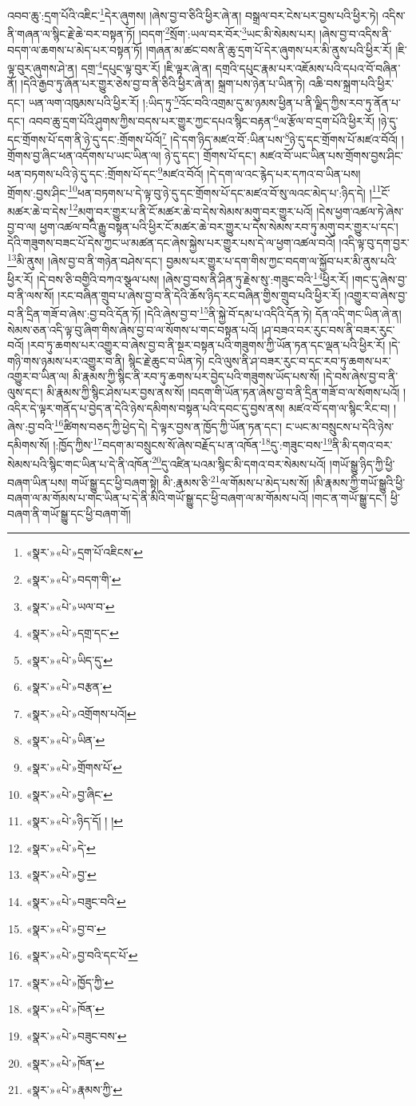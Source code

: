 འབབ་ཆུ་:དྲག་པོའི་འཇིང་\footnote{«སྣར་»«པེ་»དྲག་པོ་འཇིངས་}དེར་ཞུགས། །ཞེས་བྱ་བ་ཅིའི་ཕྱིར་ཞེ་ན། བསྒྲལ་བར་ངེས་པར་བྱས་པའི་ཕྱིར་ཏེ། འདིས་ནི་གཞན་ལ་སྙིང་རྗེ་ཆེ་བར་བསྟན་ཏོ། །བདག་\footnote{«སྣར་»«པེ་»བདག་གི་}སྲོག་:ཡལ་བར་བོར་\footnote{«སྣར་»«པེ་»ཡལ་བ་}ཡང་མི་སེམས་པར། །ཞེས་བྱ་བ་འདིས་ནི་བདག་ལ་ཆགས་པ་མེད་པར་བསྟན་ཏོ། །གཞན་མ་ཚང་བས་ནི་ཆུ་དྲག་པོ་དེར་ཞུགས་པར་མི་ནུས་པའི་ཕྱིར་རོ། །ཇི་ལྟ་བུར་ཞུགས་ཤེ་ན། དགྲ་\footnote{«སྣར་»«པེ་»དགྲ་དང་}དཔུང་ལྟ་བུར་རོ། །ཇི་ལྟར་ཞེ་ན། དགྲའི་དཔུང་རྣམ་པར་འཇོམས་པའི་དཔའ་བོ་བཞིན་ནོ། །དེའི་རྒྱབ་ཏུ་ཞོན་པར་གྱུར་ཅེས་བྱ་བ་ནི་ཅིའི་ཕྱིར་ཞེ་ན། སྐྲག་པས་ཉེན་པ་ཡིན་ཏེ། འཆི་བས་སྐྲག་པའི་ཕྱིར་དང་། ཡན་ལག་འཁུམས་པའི་ཕྱིར་རོ། །:ཡིད་ཏུ་\footnote{«སྣར་»«པེ་»ཡིད་དུ་}འོང་བའི་འགྲམ་དུ་མ་ཉམས་ཕྱིན་པ་ནི་ལྗིད་ཀྱིས་རབ་ཏུ་ནོན་པ་དང་། འབབ་ཆུ་དྲག་པོའི་ཤུགས་ཀྱིས་བདས་པར་གྱུར་ཀྱང་དཔའ་སྙིང་བརྟན་\footnote{«སྣར་»«པེ་»བརྩན་}ལ་རྩོལ་བ་དྲག་པོའི་ཕྱིར་རོ། །ཉེ་དུ་དང་གྲོགས་པོ་དག་ནི་ཉེ་དུ་དང་:གྲོགས་པོའོ།\footnote{«སྣར་»«པེ་»འགྲོགས་པའོ།} །དེ་དག་ཉིད་མཛའ་བོ་:ཡིན་པས་\footnote{«སྣར་»«པེ་»ཡིན་}ཉེ་དུ་དང་གྲོགས་པོ་མཛའ་བོའོ། །གྲོགས་བྱ་ཞིང་ཕན་འདོགས་པ་ཡང་ཡིན་ལ། ཉེ་དུ་དང་། གྲོགས་པོ་དང་། མཛའ་བོ་ཡང་ཡིན་པས་གྲོགས་བྱས་ཤིང་ཕན་བཏགས་པའི་ཉེ་དུ་དང་:གྲོགས་པོ་དང་\footnote{«སྣར་»«པེ་»གྲོགས་པོ་}མཛའ་བོའོ། །དེ་དག་ལ་འང་རྙེད་པར་དཀའ་བ་ཡིན་པས། གྲོགས་:བྱས་ཤིང་\footnote{«སྣར་»«པེ་»བྱ་ཞིང་}ཕན་བཏགས་པ་དེ་ལྟ་བུ་ཉེ་དུ་དང་གྲོགས་པོ་དང་མཛའ་བོ་སུ་ལའང་མེད་པ་:ཉིད་དེ། །\footnote{«སྣར་»«པེ་»ཉིད་དོ། ། །}ངོ་མཚར་ཆེ་བ་དེས་\footnote{«སྣར་»«པེ་»དེ་}མགུ་བར་གྱུར་པ་ནི་ངོ་མཚར་ཆེ་བ་དེས་སེམས་མགུ་བར་གྱུར་པའོ། །དེས་ཕྱག་འཚལ་ཏེ་ཞེས་བྱ་བ་ལ། ཕྱག་འཚལ་བའི་རྒྱུ་བསྟན་པའི་ཕྱིར་ངོ་མཚར་ཆེ་བར་གྱུར་པ་དེས་སེམས་རབ་ཏུ་མགུ་བར་གྱུར་པ་དང་། དེའི་གཟུགས་བཟང་པོ་དེས་ཀྱང་ཡ་མཚན་དང་ཞེས་སྐྱེས་པར་གྱུར་པས་དེ་ལ་ཕྱག་འཚལ་བའོ། །འདི་ལྟ་བུ་དག་བྱར་\footnote{«སྣར་»«པེ་»བྱ་}མི་ནུས། །ཞེས་བྱ་བ་ནི་གཉེན་བཤེས་དང་། བྱམས་པར་གྱུར་པ་དག་གིས་ཀྱང་བདག་ལ་སྐྱོབ་པར་མི་ནུས་པའི་ཕྱིར་རོ། །དེ་བས་ཅི་བགྱིའི་བཀའ་སྩལ་པས། །ཞེས་བྱ་བས་ནི་ཤིན་ཏུ་རྗེས་སུ་:གཟུང་བའི་\footnote{«སྣར་»«པེ་»བཟུང་བའི་}ཕྱིར་རོ། །གང་དུ་ཞེས་བྱ་བ་ནི་ལས་སོ། །རང་བཞིན་གྲུབ་པ་ཞེས་བྱ་བ་ནི་དེའི་ཆོས་ཉིད་རང་བཞིན་གྱིས་གྲུབ་པའི་ཕྱིར་རོ། །འགྱུར་བ་ཞེས་བྱ་བ་ནི་དྲིན་གཟོ་བ་ཞེས་:བྱ་བའི་དོན་ཏོ། །དེའི་ཞེས་བྱ་བ་\footnote{«སྣར་»«པེ་»བྱ་བ་}ནི་སྐྱེ་བོ་དམ་པ་འདིའི་དོན་ཏེ། དོན་འདི་གང་ཡིན་ཞེ་ན། སེམས་ཅན་འདི་ལྟ་བུ་ཞིག་གིས་ཞེས་བྱ་བ་ལ་སོགས་པ་གང་བསྟན་པའོ། །ཤ་བཟའ་བར་རུང་བས་ནི་བཟར་རུང་བའོ། །རབ་ཏུ་ཆགས་པར་འགྱུར་བ་ཞེས་བྱ་བ་ནི་སྔར་བསྟན་པའི་གཟུགས་ཀྱི་ཡོན་ཏན་དང་ལྡན་པའི་ཕྱིར་རོ། །དེ་གཉི་གས་ཉམས་པར་འགྱུར་བ་ནི། སྙིང་རྗེ་ཆུང་བ་ཡིན་ཏེ། ངའི་ལུས་ནི་ཤ་བཟར་རུང་བ་དང་རབ་ཏུ་ཆགས་པར་འགྱུར་བ་ཡིན་ལ། མི་རྣམས་ཀྱི་སྙིང་ནི་རབ་ཏུ་ཆགས་པར་བྱེད་པའི་གཟུགས་ཡོད་པས་སོ། །དེ་བས་ཞེས་བྱ་བ་ནི་ལུས་དང་། མི་རྣམས་ཀྱི་སྙིང་ཤེས་པར་བྱས་ནས་སོ། །བདག་གི་ཡོན་ཏན་ཞེས་བྱ་བ་ནི་དྲིན་གཟོ་བ་ལ་སོགས་པའོ། །འདིར་དེ་ལྟར་གནོད་པ་བྱེད་ན་དེའི་ཉེས་དམིགས་བསྟན་པའི་དབང་དུ་བྱས་ནས། མཛའ་བོ་དག་ལ་སྙིང་རིང་བ། །ཞེས་:བྱ་བའི་\footnote{«སྣར་»«པེ་»བྱ་བའི་དང་པོ་}ཚིགས་བཅད་ཀྱི་ཕྱེད་དེ། དེ་ལྟར་བྱས་ན་ཁྱོད་ཀྱི་ཡོན་ཏན་དང་། ང་ཡང་མ་བསྲུངས་པ་དེའི་ཉེས་དམིགས་སོ། །:ཁྱོད་ཀྱིས་\footnote{«སྣར་»«པེ་»ཁྱོད་ཀྱི་}བདག་མ་བསྲུངས་སོ་ཞེས་བརྗོད་པ་ན་འཁོན་\footnote{«སྣར་»«པེ་»ཁོན་}དུ་:གཟུང་བས་\footnote{«སྣར་»«པེ་»བཟུང་བས་}ནི་མི་དགའ་བར་སེམས་པའི་སྙིང་གང་ཡིན་པ་དེ་ནི་འཁོན་\footnote{«སྣར་»«པེ་»ཁོན་}དུ་འཛིན་པའམ་སྙིང་མི་དགའ་བར་སེམས་པའོ། །གཡོ་སྒྱུ་ཉིད་ཀྱི་ཕྱི་བཞག་ཡིན་པས། གཡོ་སྒྱུ་དང་ཕྱི་བཞག་སྟེ། མི་:རྣམས་ཅི་\footnote{«སྣར་»«པེ་»རྣམས་ཀྱི་}ལ་གོམས་པ་མེད་པས་སོ། །མི་རྣམས་ཀྱི་གཡོ་སྒྱུའི་ཕྱི་བཞག་ལ་མ་གོམས་པ་གང་ཡིན་པ་དེ་ནི་མིའི་གཡོ་སྒྱུ་དང་ཕྱི་བཞག་ལ་མ་གོམས་པའོ། །གང་ན་གཡོ་སྒྱུ་དང་། ཕྱི་བཞག་ནི་གཡོ་སྒྱུ་དང་ཕྱི་བཞག་གོ། 